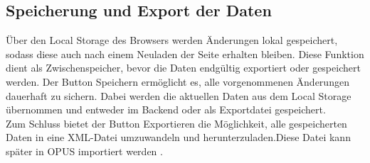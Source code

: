 \subsection{Speicherung und Export der Daten}
Über den Local Storage des Browsers werden Änderungen lokal gespeichert,
sodass diese auch nach einem Neuladen der Seite erhalten bleiben.
Diese Funktion dient als Zwischenspeicher, bevor die Daten endgültig exportiert oder gespeichert werden.
Der Button \glqq Speichern\grqq{} ermöglicht es, alle vorgenommenen Änderungen dauerhaft zu sichern.
Dabei werden die aktuellen Daten aus dem Local Storage übernommen und entweder im Backend oder als Exportdatei gespeichert.\\

\noindent Zum Schluss  bietet der Button \glqq Exportieren\grqq{} die Möglichkeit,
alle gespeicherten Daten in eine XML-Datei umzuwandeln und herunterzuladen.Diese Datei kann später in OPUS importiert werden .
